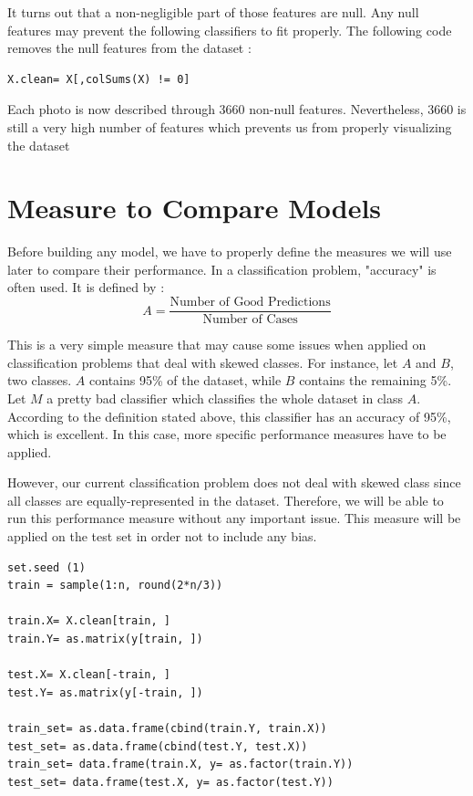 \documentclass[]{report}
\begin{document}
 It turns out that a non-negligible part of those features are null. Any null features may prevent the following classifiers to fit properly. The following code removes the null features from the dataset :
\begin{lstlisting}
X.clean= X[,colSums(X) != 0]
\end{lstlisting}
Each photo is now described through 3660 non-null features. Nevertheless, 3660 is still a very high number of features which prevents us from properly visualizing the dataset

\section{Measure to Compare Models}
Before building any model, we have to properly define the measures we will use later to compare their performance. In a classification problem, "accuracy" is often used. It is defined by :
$$
A = \frac{\text{Number of Good Predictions}}{\text{Number of Cases}}
$$

This is a very simple measure that may cause some issues when applied on classification problems that deal with skewed classes. For instance, let $A$ and $B$, two classes. $A$ contains 95\% of the dataset, while $B$ contains the remaining 5\%. Let $M$ a pretty bad classifier which classifies the whole dataset in class $A$. According to the definition stated above, this classifier has an accuracy of 95\%, which is excellent. In this case, more specific performance measures have to be applied.

However, our current classification problem does not deal with skewed class since all classes are equally-represented in the dataset. Therefore, we will be able to run this performance measure without any important issue. This measure will be applied on the test set in order not to include any bias.

\begin{lstlisting}
set.seed (1)
train = sample(1:n, round(2*n/3))

train.X= X.clean[train, ]
train.Y= as.matrix(y[train, ])

test.X= X.clean[-train, ]
test.Y= as.matrix(y[-train, ])

train_set= as.data.frame(cbind(train.Y, train.X))
test_set= as.data.frame(cbind(test.Y, test.X))
train_set= data.frame(train.X, y= as.factor(train.Y))
test_set= data.frame(test.X, y= as.factor(test.Y))
\end{lstlisting}

\pagebreak
\end{document}
